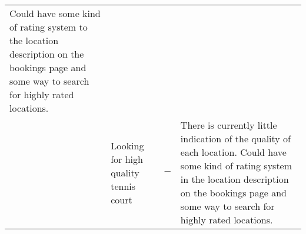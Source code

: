 \begin{center}
\begin{longtable}{p{} p{} c p{}}
		Could have some kind of rating system to the location description on
		the bookings page and some way to search for highly rated locations.\\

		& Looking for high quality tennis court & $-$ & There is currently
		little indication of the quality of each location. Could have some
		kind of rating system in the location description on the bookings page
		and some way to search for highly rated locations.\\
		\bottomrule
	\end{longtable}
\end{center}
\restoregeometry%

